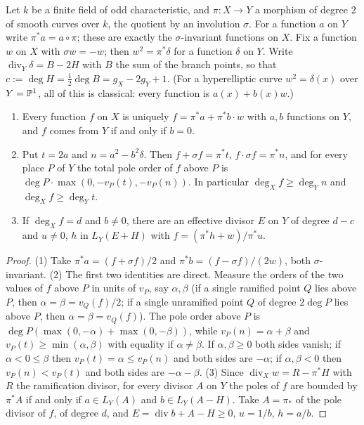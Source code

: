 Let $k$ be a finite field of odd characteristic, and $\pi\colon X\to Y$ a morphism of degree $2$ of smooth
curves over $k$, the quotient by an involution $\sigma$. For a function $a$ on $Y$ write $\pi^*a=a\circ\pi$;
these are exactly the $\sigma$-invariant functions on $X$. Fix a function $w$ on $X$ with $\sigma w=-w$; then
$w^2=\pi^*\delta$ for a function $\delta$ on $Y$. Write $\operatorname{div}_Y\delta=B-2H$ with $B$ the sum of
the branch points, so that $c:=\deg H=\tfrac12\deg B=g_X-2g_Y+1$. (For a hyperelliptic curve
$w^2=\delta(x)$ over $Y=\mathbb{P}^1$, all of this is classical: every function is $a(x)+b(x)w$.)

\begin{lemma}\label{lem:dc}
\begin{enumerate}
\item Every function $f$ on $X$ is uniquely $f=\pi^*a+\pi^*b\cdot w$ with $a,b$ functions on $Y$, and $f$ comes
 from $Y$ if and only if $b=0$.
\item Put $t=2a$ and $n=a^2-b^2\delta$. Then $f+\sigma f=\pi^*t$, $f\cdot\sigma f=\pi^*n$, and for every place
 $P$ of $Y$ the total pole order of $f$ above $P$ is $\deg P\cdot\max(0,-v_P(t),-v_P(n))$. In particular
 $\deg_Xf\ge\deg_Yn$ and $\deg_Xf\ge\deg_Yt$.
\item If $\deg_Xf=d$ and $b\ne0$, there are an effective divisor $E$ on $Y$ of degree $d-c$ and $u\ne0$, $h$ in
 $L_Y(E+H)$ with $f=(\pi^*h+w)/\pi^*u$.
\end{enumerate}
\end{lemma}
\begin{proof}
(1) Take $\pi^*a=(f+\sigma f)/2$ and $\pi^*b=(f-\sigma f)/(2w)$, both $\sigma$-invariant.
(2) The first two identities are direct. Measure the orders of the two values of $f$ above $P$ in units of
$v_P$, say $\alpha,\beta$ (if a single ramified point $Q$ lies above $P$, then $\alpha=\beta=v_Q(f)/2$; if a single
unramified point $Q$ of degree $2\deg P$ lies above $P$, then $\alpha=\beta=v_Q(f)$). The
pole order above $P$ is $\deg P(\max(0,-\alpha)+\max(0,-\beta))$, while $v_P(n)=\alpha+\beta$ and
$v_P(t)\ge\min(\alpha,\beta)$ with equality if $\alpha\ne\beta$. If $\alpha,\beta\ge0$ both sides vanish; if
$\alpha<0\le\beta$ then $v_P(t)=\alpha\le v_P(n)$ and both sides are $-\alpha$; if $\alpha,\beta<0$ then
$v_P(n)<v_P(t)$ and both sides are $-\alpha-\beta$.
(3) Since $\operatorname{div}_Xw=R-\pi^*H$ with $R$ the ramification divisor, for every divisor $A$ on $Y$ the
poles of $f$ are bounded by $\pi^*A$ if and only if $a\in L_Y(A)$ and $b\in L_Y(A-H)$. Take $A=\pi_*$ of the pole
divisor of $f$, of degree $d$, and $E=\operatorname{div}b+A-H\ge0$, $u=1/b$, $h=a/b$.
\end{proof}

